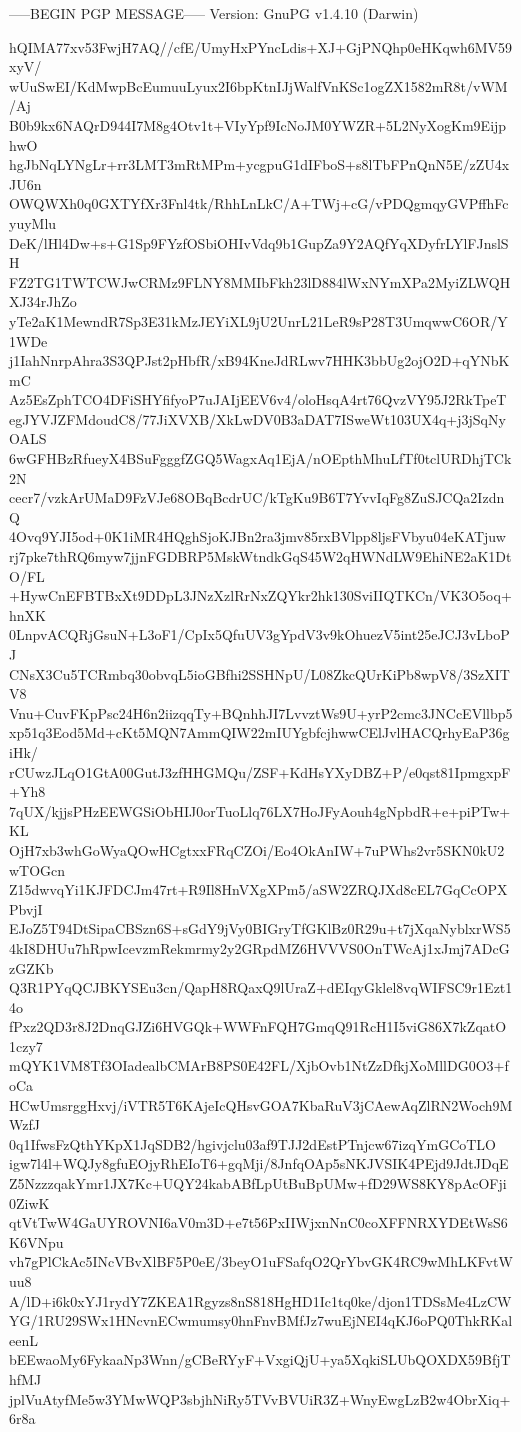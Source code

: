 -----BEGIN PGP MESSAGE-----
Version: GnuPG v1.4.10 (Darwin)

hQIMA77xv53FwjH7AQ//cfE/UmyHxPYncLdis+XJ+GjPNQhp0eHKqwh6MV59xyV/
wUuSwEI/KdMwpBcEumuuLyux2I6bpKtnIJjWalfVnKSc1ogZX1582mR8t/vWM/Aj
B0b9kx6NAQrD944I7M8g4Otv1t+VIyYpf9IcNoJM0YWZR+5L2NyXogKm9EijphwO
hgJbNqLYNgLr+rr3LMT3mRtMPm+ycgpuG1dIFboS+s8lTbFPnQnN5E/zZU4xJU6n
OWQWXh0q0GXTYfXr3Fnl4tk/RhhLnLkC/A+TWj+cG/vPDQgmqyGVPffhFcyuyMlu
DeK/lHl4Dw+s+G1Sp9FYzfOSbiOHIvVdq9b1GupZa9Y2AQfYqXDyfrLYlFJnslSH
FZ2TG1TWTCWJwCRMz9FLNY8MMIbFkh23lD884lWxNYmXPa2MyiZLWQHXJ34rJhZo
yTe2aK1MewndR7Sp3E31kMzJEYiXL9jU2UnrL21LeR9sP28T3UmqwwC6OR/Y1WDe
j1IahNnrpAhra3S3QPJst2pHbfR/xB94KneJdRLwv7HHK3bbUg2ojO2D+qYNbKmC
Az5EsZphTCO4DFiSHYfifyoP7uJAIjEEV6v4/oloHsqA4rt76QvzVY95J2RkTpeT
egJYVJZFMdoudC8/77JiXVXB/XkLwDV0B3aDAT7ISweWt103UX4q+j3jSqNyOALS
6wGFHBzRfueyX4BSuFgggfZGQ5WagxAq1EjA/nOEpthMhuLfTf0tclURDhjTCk2N
cecr7/vzkArUMaD9FzVJe68OBqBcdrUC/kTgKu9B6T7YvvIqFg8ZuSJCQa2IzdnQ
4Ovq9YJI5od+0K1iMR4HQghSjoKJBn2ra3jmv85rxBVlpp8ljsFVbyu04eKATjuw
rj7pke7thRQ6myw7jjnFGDBRP5MskWtndkGqS45W2qHWNdLW9EhiNE2aK1DtO/FL
+HywCnEFBTBxXt9DDpL3JNzXzlRrNxZQYkr2hk130SviIIQTKCn/VK3O5oq+hnXK
0LnpvACQRjGsuN+L3oF1/CpIx5QfuUV3gYpdV3v9kOhuezV5int25eJCJ3vLboPJ
CNsX3Cu5TCRmbq30obvqL5ioGBfhi2SSHNpU/L08ZkcQUrKiPb8wpV8/3SzXITV8
Vnu+CuvFKpPsc24H6n2iizqqTy+BQnhhJI7LvvztWs9U+yrP2cmc3JNCcEVllbp5
xp51q3Eod5Md+cKt5MQN7AmmQIW22mIUYgbfcjhwwCElJvlHACQrhyEaP36giHk/
rCUwzJLqO1GtA00GutJ3zfHHGMQu/ZSF+KdHsYXyDBZ+P/e0qst81IpmgxpF+Yh8
7qUX/kjjsPHzEEWGSiObHIJ0orTuoLlq76LX7HoJFyAouh4gNpbdR+e+piPTw+KL
OjH7xb3whGoWyaQOwHCgtxxFRqCZOi/Eo4OkAnIW+7uPWhs2vr5SKN0kU2wTOGcn
Z15dwvqYi1KJFDCJm47rt+R9Il8HnVXgXPm5/aSW2ZRQJXd8cEL7GqCcOPXPbvjI
EJoZ5T94DtSipaCBSzn6S+sGdY9jVy0BIGryTfGKlBz0R29u+t7jXqaNyblxrWS5
4kI8DHUu7hRpwIcevzmRekmrmy2y2GRpdMZ6HVVVS0OnTWcAj1xJmj7ADcGzGZKb
Q3R1PYqQCJBKYSEu3cn/QapH8RQaxQ9lUraZ+dEIqyGklel8vqWIFSC9r1Ezt14o
fPxz2QD3r8J2DnqGJZi6HVGQk+WWFnFQH7GmqQ91RcH1I5viG86X7kZqatO1czy7
mQYK1VM8Tf3OIadealbCMArB8PS0E42FL/XjbOvb1NtZzDfkjXoMllDG0O3+foCa
HCwUmsrggHxvj/iVTR5T6KAjeIcQHsvGOA7KbaRuV3jCAewAqZlRN2Woch9MWzfJ
0q1IfwsFzQthYKpX1JqSDB2/hgivjclu03af9TJJ2dEstPTnjcw67izqYmGCoTLO
igw7l4l+WQJy8gfuEOjyRhEIoT6+gqMji/8JnfqOAp5sNKJVSIK4PEjd9JdtJDqE
Z5NzzzqakYmr1JX7Kc+UQY24kabABfLpUtBuBpUMw+fD29WS8KY8pAcOFji0ZiwK
qtVtTwW4GaUYROVNI6aV0m3D+e7t56PxIIWjxnNnC0coXFFNRXYDEtWsS6K6VNpu
vh7gPlCkAc5INcVBvXlBF5P0eE/3beyO1uFSafqO2QrYbvGK4RC9wMhLKFvtWuu8
A/lD+i6k0xYJ1rydY7ZKEA1Rgyzs8nS818HgHD1Ic1tq0ke/djon1TDSsMe4LzCW
YG/1RU29SWx1HNcvnECwmumsy0hnFnvBMfJz7wuEjNEI4qKJ6oPQ0ThkRKaleenL
bEEwaoMy6FykaaNp3Wnn/gCBeRYyF+VxgiQjU+ya5XqkiSLUbQOXDX59BfjThfMJ
jplVuAtyfMe5w3YMwWQP3sbjhNiRy5TVvBVUiR3Z+WnyEwgLzB2w4ObrXiq+6r8a

